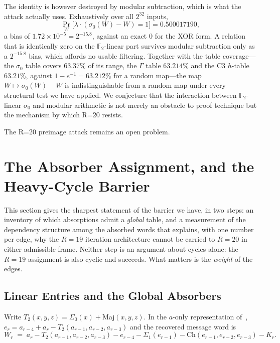 \documentclass[11pt,a4paper]{article}
\newcommand{\Sig}[1]{\Sigma_{#1}}
\newcommand{\sig}[1]{\sigma_{#1}}
\newcommand{\Maj}{\mathrm{Maj}}
\newcommand{\Ch}{\mathrm{Ch}}
\begin{document}
The identity is however destroyed by modular subtraction, which is what the attack
actually uses.  Exhaustively over all $2^{32}$ inputs,
\[
  \Pr_W\bigl[\lambda\cdot(\sig{0}(W) - W) = 1\bigr] = 0.500017190 ,
\]
a bias of $1.72\times10^{-5} = 2^{-15.8}$, against an exact $0$ for the XOR form.
A relation that is identically zero on the $\mathbb{F}_2$-linear part survives
modular subtraction only as a $2^{-15.8}$ bias, which affords no usable filtering.
Together with the table coverage---the $\sig{0}$ table covers $63.37\%$ of
its range, the $\Gamma$ table $63.214\%$ and the C3 $h$-table $63.21\%$,
against $1-e^{-1}=63.212\%$ for a random map---the map
$W\mapsto\sig{0}(W)-W$ is indistinguishable from a random map under every
structural test we have applied.  We conjecture that the interaction
between $\mathbb{F}_2$-linear $\sig{0}$ and modular arithmetic is not
merely an obstacle to proof technique but the mechanism by which R=20
resists.

The R=20 preimage attack remains an open problem.



\section{The Absorber Assignment, and the Heavy-Cycle Barrier}
\label{sec:forced}

This section gives the sharpest statement of the barrier we have, in two
steps: an inventory of which absorptions admit a \emph{global} table, and
a measurement of the dependency structure among the absorbed words that
explains, with one number per edge, why the $R{=}19$ iteration
architecture cannot be carried to $R{=}20$ in either admissible frame.
Neither step is an argument about cycles alone: the $R{=}19$ assignment is
also cyclic and succeeds.  What matters is the \emph{weight} of the edges.

\subsection{Linear Entries and the Global Absorbers}
\label{sec:linear}

Write $T_2(x,y,z)=\Sig{0}(x)+\Maj(x,y,z)$.  In the $a$-only representation
of~\cite{Basra2026R19}, $e_r = a_{r-4} + a_r - T_2(a_{r-1},a_{r-2},a_{r-3})$
and the recovered message word is
\[
  W_r \;=\; a_r - T_2(a_{r-1},a_{r-2},a_{r-3}) - e_{r-4} - \Sig{1}(e_{r-1})
          - \Ch(e_{r-1},e_{r-2},e_{r-3}) - K_r .
\]
\end{document}
